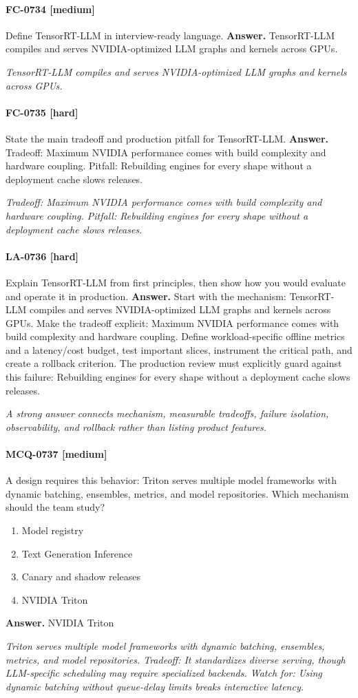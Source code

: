 \paragraph{FC-0734 [medium]} Define TensorRT-LLM in interview-ready language.
\noindent\textbf{Answer.} TensorRT-LLM compiles and serves NVIDIA-optimized LLM graphs and kernels across GPUs.
\par\textit{TensorRT-LLM compiles and serves NVIDIA-optimized LLM graphs and kernels across GPUs.}
\paragraph{FC-0735 [hard]} State the main tradeoff and production pitfall for TensorRT-LLM.
\noindent\textbf{Answer.} Tradeoff: Maximum NVIDIA performance comes with build complexity and hardware coupling. Pitfall: Rebuilding engines for every shape without a deployment cache slows releases.
\par\textit{Tradeoff: Maximum NVIDIA performance comes with build complexity and hardware coupling. Pitfall: Rebuilding engines for every shape without a deployment cache slows releases.}
\paragraph{LA-0736 [hard]} Explain TensorRT-LLM from first principles, then show how you would evaluate and operate it in production.
\noindent\textbf{Answer.} Start with the mechanism: TensorRT-LLM compiles and serves NVIDIA-optimized LLM graphs and kernels across GPUs. Make the tradeoff explicit: Maximum NVIDIA performance comes with build complexity and hardware coupling. Define workload-specific offline metrics and a latency/cost budget, test important slices, instrument the critical path, and create a rollback criterion. The production review must explicitly guard against this failure: Rebuilding engines for every shape without a deployment cache slows releases.
\par\textit{A strong answer connects mechanism, measurable tradeoffs, failure isolation, observability, and rollback rather than listing product features.}
\paragraph{MCQ-0737 [medium]} A design requires this behavior: Triton serves multiple model frameworks with dynamic batching, ensembles, metrics, and model repositories. Which mechanism should the team study?
\begin{enumerate}[label=\Alph*.]
\item Model registry
\item Text Generation Inference
\item Canary and shadow releases
\item NVIDIA Triton
\end{enumerate}
\noindent\textbf{Answer.} NVIDIA Triton
\par\textit{Triton serves multiple model frameworks with dynamic batching, ensembles, metrics, and model repositories. Tradeoff: It standardizes diverse serving, though LLM-specific scheduling may require specialized backends. Watch for: Using dynamic batching without queue-delay limits breaks interactive latency.}

